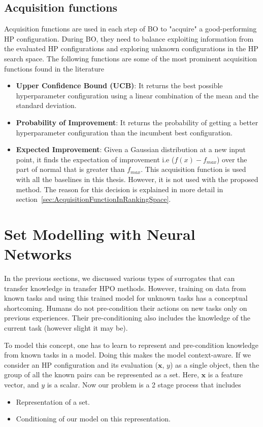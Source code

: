 \documentclass[12pt, twoside, ngerman]{report}
\begin{document}

 

\subsection{Acquisition functions}
Acquisition functions are used in each step of BO to "acquire" a good-performing HP configuration.
During BO, they need to balance exploiting information from the evaluated HP configurations and exploring unknown configurations in the HP search space.
The following functions are some of the most prominent acquisition functions found in the literature~\cite{GPTutorial}
\begin{itemize}
\item \textbf{Upper Confidence Bound (UCB)}: It returns the best possible hyperparameter configuration using a linear combination of the mean and the standard deviation.
\item \textbf{Probability of Improvement}: It returns the probability of getting a better hyperparameter configuration than the incumbent best configuration.
\item \textbf{Expected Improvement}: Given a Gaussian distribution at a new input point, it finds the expectation of improvement i.e ($f(x) - f_{max}$) over the part of normal that is greater than $f_{max}$.  This acquisition function is used with all the baselines in this thesis. However, it is not used with the proposed method. The reason for this decision is explained in more detail in section~\ref{sec:AcquisitionFunctionInRankingSpace}.
\end{itemize}


\section{Set Modelling with Neural Networks}

In the previous sections, we discussed various types of surrogates that can transfer knowledge in transfer HPO methods.
However, training on data from known tasks and using this trained model for unknown tasks has a conceptual shortcoming.
Humans do not pre-condition their actions on new tasks only on previous experiences.
Their pre-conditioning also includes the knowledge of the current task (however slight it may be).

To model this concept, one has to learn to represent and pre-condition knowledge from known tasks in a model.
Doing this makes the model context-aware.
If we consider an HP configuration and its evaluation ($\textbf{x}$, $y$) as a single object, then the group of all the known pairs can be represented as a set.
Here, $\textbf{x}$ is a feature vector, and $y$ is a scalar.
Now our problem is a 2 stage process that includes
\begin{itemize}
\item Representation of a set.
\item Conditioning of our model on this representation.
\end{itemize}
\end{document}
